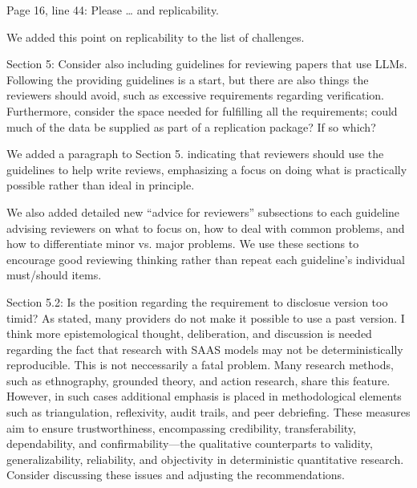 \documentclass[12pt,english]{reviewresponse}
\begin{document}
\begin{revcomment}
Page 16, line 44: Please … and replicability.
\end{revcomment}
\begin{revresponse}
    We added this point on replicability to the list of challenges.
\end{revresponse}

\begin{revcomment}
Section 5: Consider also including guidelines for reviewing papers that use LLMs. Following the providing guidelines is a start, but there are also things the reviewers should avoid, such as excessive requirements regarding verification. Furthermore, consider the space needed for fulfilling all the requirements; could much of the data be supplied as part of a replication package? If so which?
\end{revcomment}
\begin{revresponse}
   We added a paragraph to Section 5. indicating that reviewers should use the guidelines to help write reviews, emphasizing a focus on doing what is practically possible rather than ideal in principle. 

   We also added detailed new ``advice for reviewers'' subsections to each guideline advising reviewers on what to focus on, how to deal with common problems, and how to differentiate minor vs. major problems. We use these sections to encourage good reviewing thinking rather than repeat each guideline's individual must/should items.  
\end{revresponse}

\begin{revcomment}
Section 5.2: Is the position regarding the requirement to disclosue version too timid? As stated, many providers do not make it possible to use a past version. I think more epistemological thought, deliberation, and discussion is needed regarding the fact that research with SAAS models may not be deterministically reproducible.  This is not neccessarily a fatal problem. Many research methods, such as ethnography, grounded theory, and action research, share this feature. However, in such cases additional emphasis is placed in methodological elements such as triangulation, reflexivity, audit trails, and peer debriefing. These measures aim to ensure trustworthiness, encompassing credibility, transferability, dependability, and confirmability—the qualitative counterparts to validity, generalizability, reliability, and objectivity in deterministic quantitative research. Consider discussing these issues and adjusting the recommendations.
\end{revcomment}
\begin{revresponse}
\end{revresponse}
\end{document}
